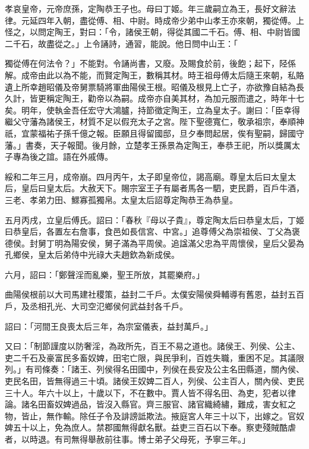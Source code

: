 
\begin{pinyinscope}
孝哀皇帝，元帝庶孫，定陶恭王子也。母曰丁姬。年三歲嗣立為王，長好文辭法律。元延四年入朝，盡從傅、相、中尉。時成帝少弟中山孝王亦來朝，獨從傅。上怪之，以問定陶王，對曰：「令，諸侯王朝，得從其國二千石。傅、相、中尉皆國二千石，故盡從之。」上令誦詩，通習，能說。他日問中山王：「

獨從傅在何法令？」不能對。令誦尚書，又廢。及賜食於前，後飽；起下，陉係解。成帝由此以為不能，而賢定陶王，數稱其材。時王祖母傅太后隨王來朝，私賂遺上所幸趙昭儀及帝舅票騎將軍曲陽侯王根。昭儀及根見上亡子，亦欲豫自結為長久計，皆更稱定陶王，勸帝以為嗣。成帝亦自美其材，為加元服而遣之，時年十七矣。明年，使執金吾任宏守大鴻臚，持節徵定陶王，立為皇太子。謝曰：「臣幸得繼父守藩為諸侯王，材質不足以假充太子之宮。陛下聖德寬仁，敬承祖宗，奉順神祇，宜蒙福祐子孫千億之報。臣願且得留國邸，旦夕奉問起居，俟有聖嗣，歸國守藩。」書奏，天子報聞。後月餘，立楚孝王孫景為定陶王，奉恭王祀，所以獎厲太子專為後之誼。語在外戚傳。

綏和二年三月，成帝崩。四月丙午，太子即皇帝位，謁高廟。尊皇太后曰太皇太后，皇后曰皇太后。大赦天下。賜宗室王子有屬者馬各一駟，吏民爵，百戶牛酒，三老、孝弟力田、鰥寡孤獨帛。太皇太后詔尊定陶恭王為恭皇。

五月丙戌，立皇后傅氏。詔曰：「春秋『母以子貴』，尊定陶太后曰恭皇太后，丁姬曰恭皇后，各置左右詹事，食邑如長信宮、中宮。」追尊傅父為崇祖侯、丁父為褒德侯。封舅丁明為陽安侯，舅子滿為平周侯。追諡滿父忠為平周懷侯，皇后父晏為孔鄉侯，皇太后弟侍中光祿大夫趙欽為新成侯。

六月，詔曰：「鄭聲淫而亂樂，聖王所放，其罷樂府。」

曲陽侯根前以大司馬建社稷策，益封二千戶。太僕安陽侯舜輔導有舊恩，益封五百戶，及丞相孔光、大司空氾鄉侯何武益封各千戶。

詔曰：「河間王良喪太后三年，為宗室儀表，益封萬戶。」

又曰：「制節謹度以防奢淫，為政所先，百王不易之道也。諸侯王、列侯、公主、吏二千石及豪富民多畜奴婢，田宅亡限，與民爭利，百姓失職，重困不足。其議限列。」有司條奏：「諸王、列侯得名田國中，列侯在長安及公主名田縣道，關內侯、吏民名田，皆無得過三十頃。諸侯王奴婢二百人，列侯、公主百人，關內侯、吏民三十人。年六十以上，十歲以下，不在數中。賈人皆不得名田、為吏，犯者以律論。諸名田畜奴婢過品，皆沒入縣官。齊三服官、諸官織綺繡，難成，害女紅之物，皆止，無作輸。除任子令及誹謗詆欺法。掖庭宮人年三十以下，出嫁之。官奴婢五十以上，免為庶人。禁郡國無得獻名獸。益吏三百石以下奉。察吏殘賊酷虐者，以時退。有司無得舉赦前往事。博士弟子父母死，予寧三年。」


\end{pinyinscope}

